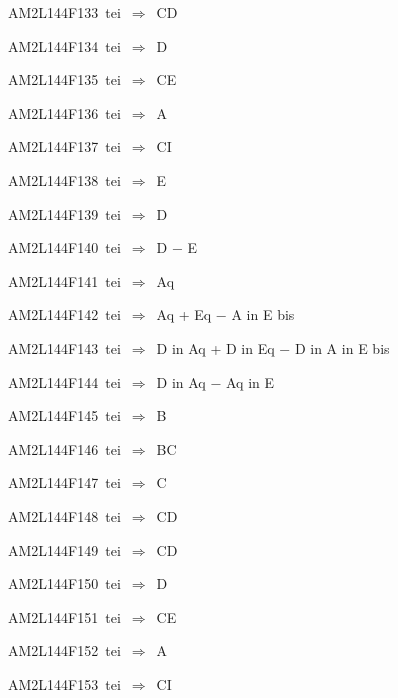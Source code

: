 {\sixrm AM2L144F133\ {\sixit tei}\ }$\Rightarrow$\ CD\par\smallskip
{\sixrm AM2L144F134\ {\sixit tei}\ }$\Rightarrow$\ {\tenit D}\par\smallskip
{\sixrm AM2L144F135\ {\sixit tei}\ }$\Rightarrow$\ CE\par\smallskip
{\sixrm AM2L144F136\ {\sixit tei}\ }$\Rightarrow$\ {\tenit A}\par\smallskip
{\sixrm AM2L144F137\ {\sixit tei}\ }$\Rightarrow$\ CI\par\smallskip
{\sixrm AM2L144F138\ {\sixit tei}\ }$\Rightarrow$\ {\tenit E}\par\smallskip
{\sixrm AM2L144F139\ {\sixit tei}\ }$\Rightarrow$\ {\tenit D}\par\smallskip
{\sixrm AM2L144F140\ {\sixit tei}\ }$\Rightarrow$\ {\tenit D} − {\tenit E}\par\smallskip
{\sixrm AM2L144F141\ {\sixit tei}\ }$\Rightarrow$\ {\tenit Aq}\par\smallskip
{\sixrm AM2L144F142\ {\sixit tei}\ }$\Rightarrow$\ {\tenit Aq} + {\tenit Eq} − {\tenit A} {\tenit in}
{\tenit E} {\tenit bis}\par\smallskip
{\sixrm AM2L144F143\ {\sixit tei}\ }$\Rightarrow$\ {\tenit D} {\tenit in} {\tenit Aq} + {\tenit D} {\tenit in}
{\tenit Eq} − {\tenit D} {\tenit in} {\tenit A} {\tenit in} {\tenit E} {\tenit bis}\par\smallskip
{\sixrm AM2L144F144\ {\sixit tei}\ }$\Rightarrow$\ {\tenit D} {\tenit in}
{\tenit Aq} − {\tenit Aq} {\tenit in} {\tenit E}\par\smallskip
{\sixrm AM2L144F145\ {\sixit tei}\ }$\Rightarrow$\ B\par\smallskip
{\sixrm AM2L144F146\ {\sixit tei}\ }$\Rightarrow$\ BC\par\smallskip
{\sixrm AM2L144F147\ {\sixit tei}\ }$\Rightarrow$\ C\par\smallskip
{\sixrm AM2L144F148\ {\sixit tei}\ }$\Rightarrow$\ CD\par\smallskip
{\sixrm AM2L144F149\ {\sixit tei}\ }$\Rightarrow$\ CD\par\smallskip
{\sixrm AM2L144F150\ {\sixit tei}\ }$\Rightarrow$\ {\tenit D}\par\smallskip
{\sixrm AM2L144F151\ {\sixit tei}\ }$\Rightarrow$\ CE\par\smallskip
{\sixrm AM2L144F152\ {\sixit tei}\ }$\Rightarrow$\ {\tenit A}\par\smallskip
{\sixrm AM2L144F153\ {\sixit tei}\ }$\Rightarrow$\ CI\par\smallskip
